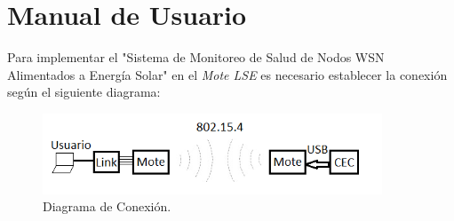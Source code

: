 
\chapter{Manual de Usuario} %

\label{AppendixA} %
Para implementar el "Sistema de Monitoreo de Salud de Nodos WSN Alimentados a Energía Solar" en el \textit{Mote LSE} es necesario establecer la conexión según el siguiente diagrama:
\vspace{10px}
\begin{figure}[h!]
	\centering
    \includegraphics[width=0.9\textwidth]{./Figures/conex.png}
    	\caption{Diagrama de Conexión.}
	\label{fig:conex}
\end{figure}

